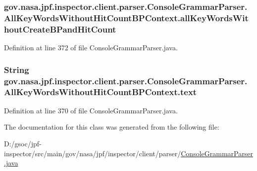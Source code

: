 \subsubsection[{\texorpdfstring{all\+Key\+Words\+Without\+Create\+B\+Pand\+Hit\+Count}{allKeyWordsWithoutCreateBPandHitCount}}]{ gov.\+nasa.\+jpf.\+inspector.\+client.\+parser.\+Console\+Grammar\+Parser.\+All\+Key\+Words\+Without\+Hit\+Count\+B\+P\+Context.\+all\+Key\+Words\+Without\+Create\+B\+Pand\+Hit\+Count}\hypertarget{classgov_1_1nasa_1_1jpf_1_1inspector_1_1client_1_1parser_1_1_console_grammar_parser_1_1_all_key_4612626c1f72cea22831f9624187dc64_aa664dbad1a9968ed7ce756a212071e65}{}\label{classgov_1_1nasa_1_1jpf_1_1inspector_1_1client_1_1parser_1_1_console_grammar_parser_1_1_all_key_4612626c1f72cea22831f9624187dc64_aa664dbad1a9968ed7ce756a212071e65}


Definition at line 372 of file Console\+Grammar\+Parser.\+java.

\subsubsection[{\texorpdfstring{text}{text}}]{\setlength{\rightskip}{0pt plus 5cm}String gov.\+nasa.\+jpf.\+inspector.\+client.\+parser.\+Console\+Grammar\+Parser.\+All\+Key\+Words\+Without\+Hit\+Count\+B\+P\+Context.\+text}\hypertarget{classgov_1_1nasa_1_1jpf_1_1inspector_1_1client_1_1parser_1_1_console_grammar_parser_1_1_all_key_4612626c1f72cea22831f9624187dc64_a6bdb364f0f2292d6668735e4057040da}{}\label{classgov_1_1nasa_1_1jpf_1_1inspector_1_1client_1_1parser_1_1_console_grammar_parser_1_1_all_key_4612626c1f72cea22831f9624187dc64_a6bdb364f0f2292d6668735e4057040da}


Definition at line 370 of file Console\+Grammar\+Parser.\+java.



The documentation for this class was generated from the following file\+:\begin{DoxyCompactItemize}
\item 
D\+:/gsoc/jpf-\/inspector/src/main/gov/nasa/jpf/inspector/client/parser/\hyperlink{_console_grammar_parser_8java}{Console\+Grammar\+Parser.\+java}\end{DoxyCompactItemize}
